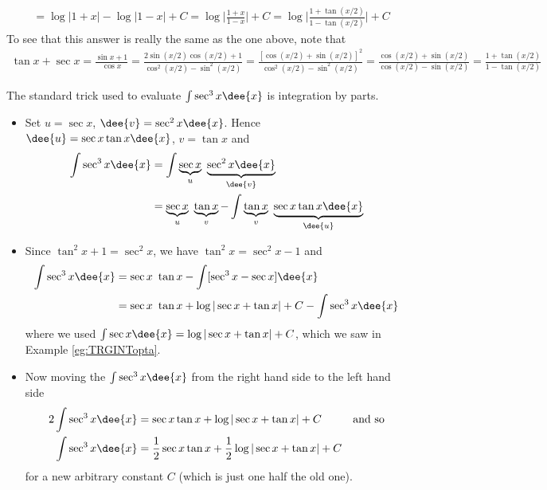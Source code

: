 \begin{eg}[$\int \csc x\dee{x}$ --- by the $u=\tan\frac{x}{2}$ substitution]
\begin{itemize}
{\begin{align*}
&=\log|1+x|-\log|1-x|+C
=\log\big|\frac{1+x}{1-x}\big|+C
=\log\big|\frac{1+\tan(x/2)}{1-\tan(x/2)}\big|+C
\end{align*}
To see that this answer is really the same as the one above, note that
\begin{align*}
\tan x+\sec x
=\frac{\sin x+1}{\cos x}
=\frac{2\sin(x/2)\cos(x/2)+1}{\cos^2 (x/2)-\sin^2(x/2)}
=\frac{[\cos(x/2)+\sin(x/2)]^2}{\cos^2 (x/2)-\sin^2(x/2)}
=\frac{\cos(x/2)+\sin(x/2)}{\cos (x/2)-\sin(x/2)}
=\frac{1+\tan(x/2)}{1-\tan(x/2)}
\end{align*}
} %

\end{itemize}
\end{eg}

\begin{eg}\label{eg:TRGINToptd}
\soln The standard trick used to evaluate $\int \sec^3 x\dee{x}$ is integration by
parts.
\begin{itemize}
 \item Set $u=\sec x$, $\dee{v}=\sec^2 x\dee{x}$. Hence $\dee{u}=\sec x\tan x\dee{x}$,
$v=\tan x$ and
\begin{align*}
\int \sec^3 x\dee{x}
&=\int \underbrace{\sec x}_{u}\ \underbrace{\sec^2 x\dee{x}}_{\dee{v}} \\
&=\underbrace{\sec x}_{u}\ \underbrace{\tan x}_{v}
         -\int \underbrace{\tan x}_{v}\ \underbrace{\sec x\tan x\dee{x}}_{\dee{u}}
\end{align*}
\item Since $\tan^2 x+1=\sec^2 x$, we have $\tan^2 x=\sec^2 x-1$ and
\begin{align*}
\int \sec^3 x\dee{x}
&=\sec x\ \tan x -\int [\sec^3 x-\sec x]\dee{x} \\
&=\sec x\ \tan x +\log|\sec x+\tan x|+C -\int \sec^3 x\dee{x}
\end{align*}
where we used $\int \sec x\dee{x} = \log|\sec x+\tan x|+C$, which
we saw in Example \ref{eg:TRGINTopta}.
\item Now moving the $\int \sec^3 x\dee{x}$ from the right hand side to the left hand side
\begin{align*}
2\int \sec^3 x\dee{x}
&=\sec x\tan x +\log|\sec x+\tan x|+C & \text{and so}\\
\int \sec^3 x\dee{x}
&=\frac{1}{2} \sec x\tan x +\frac{1}{2}\log|\sec x+\tan x|+C
\end{align*}
for a new arbitrary constant $C$ (which is just one half the old one).
\end{itemize}
\end{eg}

